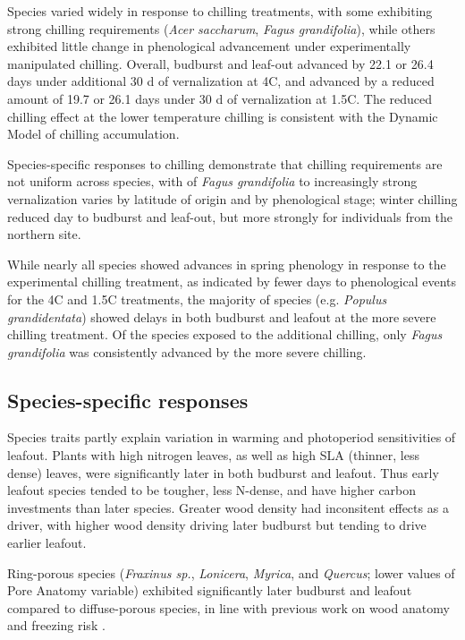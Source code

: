 \documentclass{article}
\begin{document}
Species varied widely in response to chilling treatments, with some exhibiting strong chilling requirements (\emph{Acer saccharum}, \emph{Fagus grandifolia}), while others exhibited little change in phenological advancement under experimentally manipulated chilling. Overall, budburst and leaf-out advanced by 22.1 or 26.4 days under additional 30 d of vernalization at 4\degree C, and advanced by a reduced amount of 19.7 or 26.1 days under 30 d of vernalization at 1.5\degree C. The reduced chilling effect at the lower temperature chilling is consistent with the Dynamic Model of chilling accumulation. %

Species-specific responses to chilling demonstrate that chilling requirements are not uniform across species, with 
of \emph{Fagus grandifolia} to increasingly strong vernalization varies by latitude of origin and by phenological stage; winter chilling reduced day to budburst and leaf-out, but more strongly for individuals from the northern site.

While nearly all species showed advances in spring phenology in response to the experimental chilling treatment, as indicated by fewer days to phenological events for the 4\degree C and 1.5\degree C treatments, the majority of species (e.g. \emph{Populus grandidentata}) showed delays in both budburst and leafout at the more severe chilling treatment. Of the species exposed to the additional chilling, only \emph{Fagus grandifolia} was consistently advanced by the more severe chilling.

\subsection*{Species-specific responses}

Species traits partly explain variation in warming and photoperiod sensitivities of leafout. Plants with high nitrogen leaves, as well as high SLA (thinner, less dense) leaves, were significantly later in both budburst and leafout. Thus early leafout species tended to be tougher, less N-dense, and have higher carbon investments than later species. Greater wood density had inconsitent effects as a driver, with higher wood density driving later budburst but tending to drive earlier leafout.

Ring-porous species (\emph{Fraxinus sp.}, \emph{Lonicera}, \emph{Myrica}, and \emph{Quercus}; lower values of Pore Anatomy variable) exhibited significantly later budburst and leafout compared to diffuse-porous species, in line with previous work on wood anatomy and freezing risk \cite{Sperry:1992}.
\end{document}
